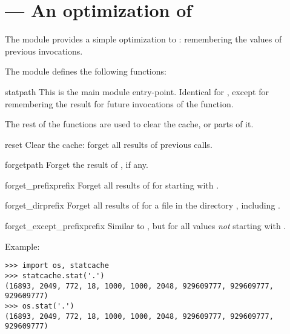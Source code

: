 \section{ ---
         An optimization of }


The  module provides a simple optimization to
: remembering the values of previous invocations.

The  module defines the following functions:

\begin{funcdesc}{stat}{path}
This is the main module entry-point.
Identical for , except for remembering the result
for future invocations of the function.
\end{funcdesc}

The rest of the functions are used to clear the cache, or parts of
it.

\begin{funcdesc}{reset}{}
Clear the cache: forget all results of previous 
calls.
\end{funcdesc}

\begin{funcdesc}{forget}{path}
Forget the result of , if any.
\end{funcdesc}

\begin{funcdesc}{forget_prefix}{prefix}
Forget all results of  for  starting
with .
\end{funcdesc}

\begin{funcdesc}{forget_dir}{prefix}
Forget all results of  for  a file in 
the directory , including .
\end{funcdesc}

\begin{funcdesc}{forget_except_prefix}{prefix}
Similar to , but for all  values
\emph{not} starting with .
\end{funcdesc}

Example:

\begin{verbatim}
>>> import os, statcache
>>> statcache.stat('.')
(16893, 2049, 772, 18, 1000, 1000, 2048, 929609777, 929609777, 929609777)
>>> os.stat('.')
(16893, 2049, 772, 18, 1000, 1000, 2048, 929609777, 929609777, 929609777)
\end{verbatim}

